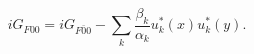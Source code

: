 \begin{equation} \label{in in in out bulk}
iG_{F00}= iG_{F\bar{0}{0}} - \sum_k \frac{\beta_k}{\alpha_k} u_k^*(x)u_k^*(y) .
\end{equation}

